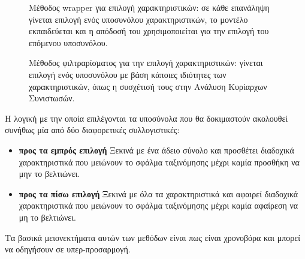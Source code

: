 \begin{figure}[!htb]
	\begin{minipage}{0.45\textwidth}
		\caption[Μέθοδος wrapper για επιλογή χαρακτηριστικών]{Μέθοδος wrapper για επιλογή χαρακτηριστικών: σε κάθε επανάληψη γίνεται επιλογή ενός υποσυνόλου χαρακτηριστικών, το μοντέλο εκπαιδεύεται και η απόδοσή του χρησιμοποιείται για την επιλογή του επόμενου υποσυνόλου.}
		\label{fig:wrapper}
	\end{minipage} \qquad
	\begin{minipage}{0.45\textwidth}
		\caption[Μέθοδος φιλτραρίσματος για την επιλογή χαρακτηριστικών]{Μέθοδος φιλτραρίσματος για την επιλογή χαρακτηριστικών: γίνεται επιλογή ενός υποσυνόλου με βάση κάποιες ιδιότητες των χαρακτηριστικών, όπως η συσχέτισή τους στην Ανάλυση Κυρίαρχων Συνιστωσών.}
	\end{minipage}
\end{figure}

Η λογική με την οποία επιλέγονται τα υποσύνολα που θα δοκιμαστούν ακολουθεί συνήθως μία από δύο διαφορετικές συλλογιστικές:
\begin{itemize}
	\item \textbf{προς τα εμπρός επιλογή} Ξεκινά με ένα άδειο σύνολο και προσθέτει διαδοχικά χαρακτηριστικά που μειώνουν το σφάλμα ταξινόμησης μέχρι καμία προσθήκη να μην το βελτιώνει.
	\item \textbf{προς τα πίσω επιλογή} Ξεκινά με όλα τα χαρακτηριστικά και αφαιρεί διαδοχικά χαρακτηριστικά που μειώνουν το σφάλμα ταξινόμησης μέχρι καμία αφαίρεση να μη το βελτιώνει.
\end{itemize}
Τα βασικά μειονεκτήματα αυτών των μεθόδων είναι πως είναι χρονοβόρα και μπορεί να οδηγήσουν σε υπερ-προσαρμογή.

